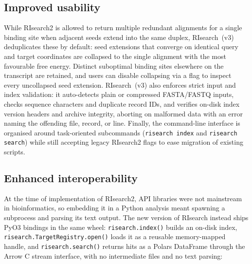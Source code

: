 \documentclass[unnumsec,webpdf,contemporary,large]{oup-authoring-template}
\newcommand{\JG}[1]{{\color{JGCOLOR}#1}}
\begin{document}
\subsection*{Improved usability}

While RIsearch2 is allowed to return multiple redundant alignments for a single binding site when adjacent seeds extend into the same duplex, RIsearch~(v3) deduplicates these by default: seed extensions that converge on identical query and target coordinates are collapsed to the single alignment with the most favourable free energy.
Distinct suboptimal binding sites elsewhere on the transcript are retained, and users can disable collapsing via a flag to inspect every uncollapsed seed extension.
RIsearch~(v3) also enforces strict input and index validation: it auto-detects plain or compressed FASTA/FASTQ inputs, checks sequence characters and duplicate record IDs, and verifies on-disk index version headers and archive integrity, aborting on malformed data with an error naming the offending file, record, or line.
Finally, the command-line interface is organised around task-oriented subcommands (\texttt{risearch index} and \texttt{risearch search}) while still accepting legacy RIsearch2 flags to ease migration of existing scripts.

\subsection*{Enhanced interoperability}

At the time of implementation of RIsearch2, API libraries were not mainstream in bioinformatics, so embedding it in a Python analysis meant spawning a subprocess and parsing its text output.
The new version of RIsearch instead ships PyO3 bindings in the same wheel: \texttt{risearch.index()} builds an on-disk index, \texttt{risearch.TargetRegistry.open()} loads it as a reusable memory-mapped handle, and \texttt{risearch.search()} returns hits as a Polars DataFrame through the Arrow C stream interface, with no intermediate files and no text parsing:
\end{document}
